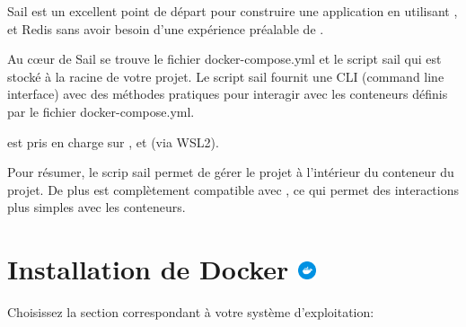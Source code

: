\documentclass[internal]{nhitec_design}
\begin{document}
        Sail est un excellent point de départ pour construire une application \laravel{} en utilisant \php{}, \mysql et Redis sans avoir besoin d'une expérience préalable de \docker{}.

        Au cœur de Sail se trouve le fichier docker-compose.yml et le script sail qui est stocké à la racine de votre projet. Le script sail fournit une CLI (command line interface) avec des méthodes pratiques pour interagir avec les conteneurs \docker{} définis par le fichier docker-compose.yml.

        \laravelsail{} est pris en charge sur \macos{}, \linux{} et \windows{} (via WSL2).

        Pour résumer, le scrip sail permet de gérer le projet \laravel{} à l'intérieur du conteneur du projet. De plus \laravelsail{} est complètement compatible avec \docker{}, ce qui permet des interactions plus simples avec les conteneurs.

\section[Installation de Docker]{Installation de Docker \includegraphics[height=15pt]{figures-logos/docker.pdf}}

Choisissez la section correspondant à votre système d'exploitation:
\end{document}
